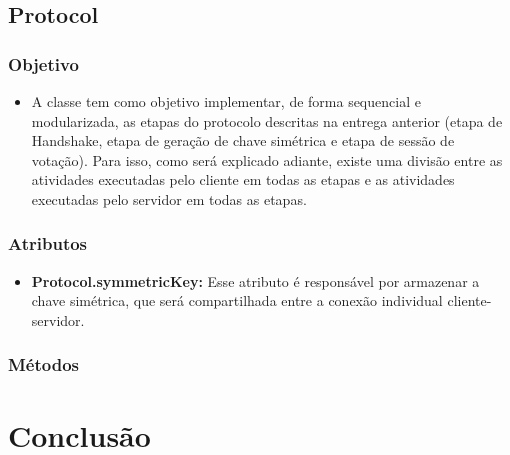 \documentclass[10pt]{article}
\begin{document}
\begin{itemize}
    \subsection{\Large Protocol}
        \subsubsection{\large Objetivo}
            \begin{itemize}
            \item A classe tem como objetivo implementar, de forma sequencial e modularizada, as etapas do protocolo descritas na entrega anterior (etapa de Handshake, etapa de geração de chave simétrica e etapa de sessão de votação). Para isso, como será explicado adiante, existe uma divisão entre as atividades executadas pelo cliente em todas as etapas e as atividades executadas pelo servidor em todas as etapas.
            \end{itemize}
        \subsubsection{\large Atributos}
            \begin{itemize}
            \item \textbf{Protocol.symmetricKey:}  Esse atributo é responsável por armazenar a chave simétrica, que será compartilhada entre a conexão individual cliente-servidor. 
            
            \end{itemize}
        \subsubsection{\large Métodos}
    \end{itemize}

\section{Conclusão}
\end{document}
